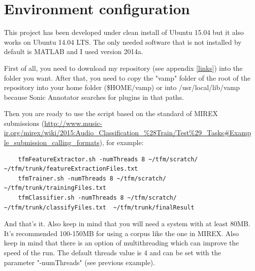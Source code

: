 \documentclass[a4paper,openany,oneside,12pt]{book}
\begin{document}
\chapter{Environment configuration}\label{configuration}

This project has been developed under clean install of Ubuntu 15.04 but it also works on Ubuntu 14.04 LTS. The only needed software that is not installed by default is MATLAB and I used version 2014a.

First of all, you need to download my repository (see appendix \ref{links}) into the folder you want. After that, you need to copy the "vamp" folder of the root of the repository into your home folder (\$HOME/vamp) or into /usr/local/lib/vamp because Sonic Annotator searches for plugins in that paths.

Then you are ready to use the script based on the standard of MIREX submissions (\url{http://www.music-ir.org/mirex/wiki/2015:Audio_Classification_%28Train/Test%29_Tasks#Example_submission_calling_formats}), for example:
   \lstset{language=Bash,
           basicstyle=\ttfamily\scriptsize,
           keywordstyle=\ttfamily,
           stringstyle=\ttfamily,
           commentstyle=\ttfamily,
          breaklines=true
          }
\begin{lstlisting}
	tfmFeatureExtractor.sh -numThreads 8 ~/tfm/scratch/ ~/tfm/trunk/featureExtractionFiles.txt
	tfmTrainer.sh -numThreads 8 ~/tfm/scratch/ ~/tfm/trunk/trainingFiles.txt
	tfmClassifier.sh -numThreads 8 ~/tfm/scratch/ ~/tfm/trunk/classifyFiles.txt  ~/tfm/trunk/finalResult
\end{lstlisting}
	
And that's it. Also keep in mind that you will need a system with at least 80MB. It's recommended 100-150MB for using a corpus like the one in MIREX. Also keep in mind that there is an option of multithreading which can improve the speed of the run. The default threads value is 4 and can be set with the parameter "-numThreads" (see previous example).
\end{document}
